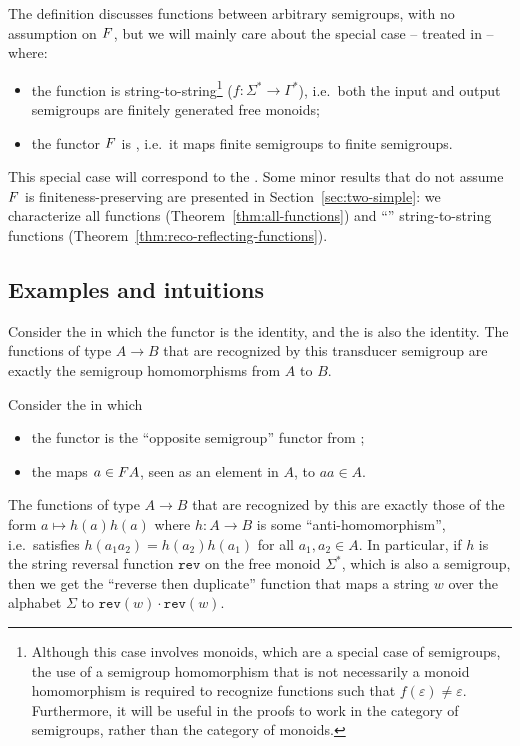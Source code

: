 \AP The definition discusses functions between arbitrary semigroups, with no
assumption on $\functor$, but we will
mainly care about the special case -- treated in  -- where:
\begin{itemize}
\item the function is string-to-string\footnote{Although this case involves monoids,
    which are a special case of semigroups, the use of a semigroup homomorphism that
    is not necessarily a monoid homomorphism is required to recognize functions such
    that $f(\varepsilon)\neq\varepsilon$. Furthermore, it will be useful in the
    proofs to work in the category of semigroups, rather than the category of monoids.} ($f\colon\Sigma^*\to\Gamma^*$), i.e.\
  both the input and output semigroups are finitely generated free monoids;
\item the functor $\functor$ is
  , i.e.~it maps finite semigroups to finite
  semigroups.
\end{itemize}
This special case will correspond to the . Some
minor results that do not assume $\functor$ is finiteness-preserving are presented in Section~\ref{sec:two-simple}: we characterize all functions (Theorem~\ref{thm:all-functions}) and \enquote{} string-to-string functions (Theorem~\ref{thm:reco-reflecting-functions}).

\subsection{Examples and intuitions}

\begin{example}
 Consider the  in which the functor is the identity, and the  is also the identity. The functions of type $A \to B$ that are recognized by this transducer semigroup are exactly the semigroup homomorphisms from $A$ to $B$.
\end{example}

\begin{example}\label{ex:reverse-duplicate}
  Consider the  in which
  \begin{itemize}
  \item the functor is the \enquote{opposite semigroup} functor from
    \Cref{ex:functors};
  \item the  maps $a\in\functor A$, seen as an element in $A$, to
    $aa \in A$.
  \end{itemize}
  The functions of type $A \to B$ that are recognized by this  are exactly those of the form $a \mapsto h(a)h(a)$ where $h\colon A
  \to B$ is some \enquote{anti-homomorphism}, i.e.\ satisfies
  $h(a_1a_2)=h(a_2)h(a_1)$ for all $a_1,a_2\in A$. In particular, if $h$ is the
  string reversal function $\mathtt{rev}$ on the free monoid $\Sigma^*$, which
  is also a semigroup, then we get the \enquote{reverse then duplicate} function
  that maps a string $w$ over the alphabet $\Sigma$ to $\mathtt{rev}(w) \cdot
  \mathtt{rev}(w)$.
\end{example}

